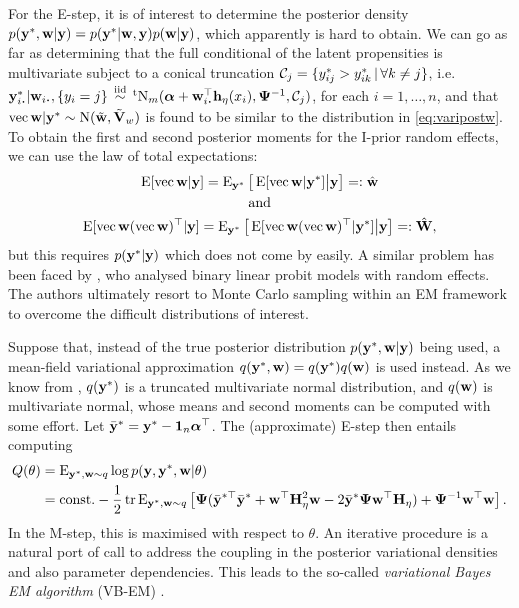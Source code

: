 For the E-step, it is of interest to determine the posterior density $p({\mathbf y}^*,{\mathbf w}|{\mathbf y}) = p({\mathbf y}^*|{\mathbf w},{\mathbf y})p({\mathbf w}|{\mathbf y})$, which apparently is hard to obtain.
We can go as far as determining that the full conditional of the latent propensities is multivariate subject to a conical truncation ${\mathcal C}_j = \{y_{ij}^* > y_{ik}^* \,|\, \forall k \neq j \}$, i.e. $\by^*_{i \bigcdot}|\bw_{i \bigcdot},\{y_i=j\} \iid \tN_m(\balpha + \bw_{i \bigcdot}^\top\bh_\eta(x_i), \bPsi^{-1},\cC_j)$, for each $i=1,\dots,n$, and that $\operatorname{vec} {\mathbf w}|{\mathbf y}^*\sim \operatorname{N}(\tilde{{\mathbf w}},\tilde{{\mathbf V}}_w)$ is found to be similar to the distribution in \cref{eq:varipostw}.
To obtain the first and second posterior moments for the I-prior random effects, we can use the law of total expectations:
\begin{gather*}
  \operatorname{E}[\operatorname{vec} {\mathbf w}|{\mathbf y}]
  = \operatorname{E}_{{\mathbf y}^*} \big[ \operatorname{E}[\operatorname{vec} {\mathbf w} | {\mathbf y}^*] \big| {\mathbf y} \big] =: \hat{{\mathbf w}} \\
  \text{and}\\
  \operatorname{E}[\operatorname{vec} {\mathbf w} (\operatorname{vec} {\mathbf w})^\top|{\mathbf y}]
  = \operatorname{E}_{{\mathbf y}^*} \big[ \operatorname{E}[\operatorname{vec} {\mathbf w} (\operatorname{vec} {\mathbf w})^\top| {\mathbf y}^*] \big| {\mathbf y} \big] =: \hat{{\mathbf W}} ,
\end{gather*}
but this requires $p({\mathbf y}^*|{\mathbf y})$ which does not come by easily.
A similar problem has been faced by \citet{chan1997maximum}, who analysed binary linear probit models with random effects.
The authors ultimately resort to Monte Carlo sampling within an EM framework to overcome the difficult distributions of interest.

Suppose that, instead of the true posterior distribution $p({\mathbf y}^*,{\mathbf w}|{\mathbf y})$ being used, a mean-field variational approximation $q({\mathbf y}^*,{\mathbf w}) = q({\mathbf y}^*)q({\mathbf w})$ is used instead.
As we know from , $q({\mathbf y}^*)$ is a truncated multivariate normal distribution, and $q({\mathbf w})$ is multivariate normal, whose means and second moments can be computed with some  effort.
Let $\bar{{\mathbf y}}^* = {\mathbf y}^* - {\mathbf 1}_n{\bm\alpha}^\top$.
The (approximate) E-step then entails computing
\begin{align*}
  Q(\theta) 
  &= \operatorname{E}_{{\mathbf y}^*,{\mathbf w}\sim q}  \log p({\mathbf y},{\mathbf y}^*,{\mathbf w}|\theta) \\
  &= \text{const.}\hspace{0.01em} -\frac{1}{2} \operatorname{tr}\operatorname{E}_{{\mathbf y}^*,{\mathbf w}\sim q} \left[ 
  {\bm\Psi}(\bar{{\mathbf y}}^{*\top}\bar{{\mathbf y}}^* + {\mathbf w}^\top{\mathbf H}_\eta^2{\mathbf w} - 2\bar{{\mathbf y}}^*{\bm\Psi}{\mathbf w}^\top{\mathbf H}_\eta )
  + {\bm\Psi}^{-1} {\mathbf w}^\top{\mathbf w} 
  \right].
\end{align*}
In the M-step, this is maximised with respect to $\theta$.
An iterative procedure is a natural port of call to address the coupling in the posterior variational densities and also parameter dependencies.
This leads to the so-called \emph{variational Bayes EM algorithm} (VB-EM) \citep{beal2003}.


